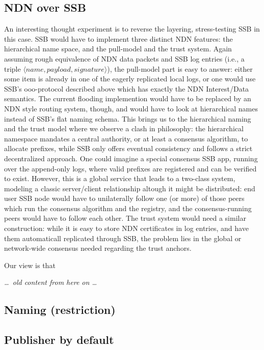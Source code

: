 \documentclass[sigconf]{acmart}
\begin{document}
\subsection{NDN over SSB}

An interesting thought experiment is to reverse the layering,
stress-testing SSB in this case. SSB would have to implement three
distinct NDN features: the hierarchical name space, and the pull-model
and the trust system. Again assuming rough equivalence of NDN data
packets and SSB log entries (i.e., a triple $\langle
name,payload,signature\rangle$), the pull-model part is easy to
answer: either some item is already in one of the eagerly replicated
local logs, or one would use SSB's ooo-protocol described above which
has exactly the NDN Interest/Data semantics. The current flooding
implemention would have to be replaced by an NDN style routing system,
though, and would have to look at hierarchical names instead of SSB's
flat naming schema. This brings us to the hierarchical naming and the
trust model where we observe a clash in philosophy: the hierarchical
namespace mandates a central authority, or at least a consensus
algorithm, to allocate prefixes, while SSB only offers eventual
consistency and follows a strict decentralized approach. One could
imagine a special consensus SSB app, running over the append-only
logs, where valid prefixes are registered and can be verified to
exist. However, this is a global service that leads to a two-class
system, modeling a classic server/client relationship altough it might
be distributed: end user SSB node would have to unilaterally follow
one (or more) of those peers which run the consensus algorithm and the
registry, and the consensus-running peers would have to follow each
other. The trust system would need a similar construction: while it is
easy to store NDN certificates in log entries, and have them
automaticall replicated through SSB, the problem lies in the global
or network-wide consensus needed regarding the trust anchors.

Our view is that

{\em\ldots\ old content from here on \ldots}

\subsection{Naming (restriction)}

\subsection{Publisher by default}
\end{document}
